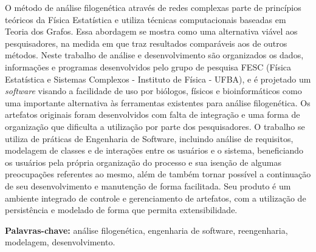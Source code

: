 \documentclass[normaltoc,capchap,capsec,times]{abnt}
\begin{document}



\begin{resumo}
O método de análise filogenética através de redes complexas parte de princípios teóricos da Física Estatística e utiliza técnicas computacionais
baseadas em Teoria dos Grafos. Essa abordagem se mostra como uma alternativa viável aos pesquisadores, na medida em que traz resultados comparáveis aos
de outros métodos. Neste trabalho de análise e desenvolvimento são organizados os dados, informações e programas desenvolvidos pelo grupo
de pesquisa FESC (Física Estatística e Sistemas Complexos - Instituto de Física - UFBA), e é projetado um \textit{software} visando a facilidade de uso
por biólogos, físicos e bioinformáticos como uma importante alternativa às ferramentas existentes para análise filogenética. Os artefatos originais foram
desenvolvidos com falta de integração e uma forma de organização que dificulta a utilização por parte dos pesquisadores. O trabalho se utiliza de
práticas de Engenharia de Software, incluindo análise de requisitos, modelagem de classes e de interações entre os usuários e o sistema, beneficiando os
usuários pela própria organização do processo e sua isenção de algumas preocupações referentes ao mesmo, além de também tornar possível a continuação
de seu desenvolvimento e manutenção de forma facilitada. Seu produto é um ambiente integrado de controle e gerenciamento de artefatos, com a utilização de
persistência e modelado de forma que permita extensibilidade.


\textbf{Palavras-chave:}
análise filogenética,
engenharia de software, 
reengenharia,
modelagem,
desenvolvimento.
\end{resumo}
\end{document}
